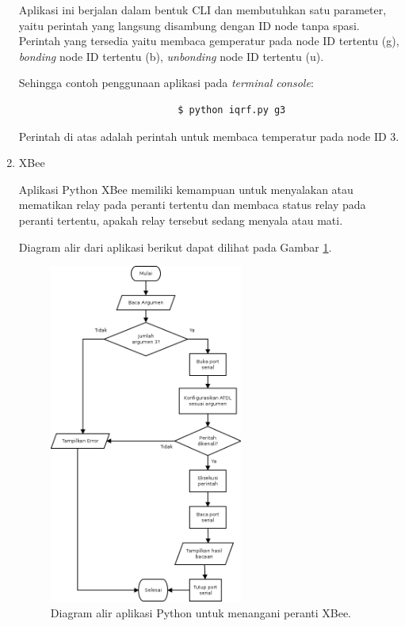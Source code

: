 \begin{enumerate}
					Aplikasi ini berjalan dalam bentuk CLI dan membutuhkan satu parameter, yaitu perintah yang langsung disambung dengan ID node tanpa spasi. Perintah yang tersedia yaitu membaca gemperatur pada node ID tertentu (g), \emph{bonding} node ID tertentu (b), \emph{unbonding} node ID tertentu (u).

					Sehingga contoh penggunaan aplikasi pada \emph{terminal console}:
					\begingroup
					    \fontsize{10pt}{12pt}\selectfont
					    \begin{verbatim}
							$ python iqrf.py g3
					    \end{verbatim}  
					\endgroup
					Perintah di atas adalah perintah untuk membaca temperatur pada node ID 3.

				\item XBee

					Aplikasi Python XBee memiliki kemampuan untuk menyalakan atau mematikan relay pada peranti tertentu dan membaca status relay pada peranti tertentu, apakah relay tersebut sedang menyala atau mati.

					Diagram alir dari aplikasi berikut dapat dilihat pada Gambar \ref{python-xbee}.

					\begin{figure}[H]
					  \centering
					    \includegraphics[width=0.6\textwidth]{gambar/python-xbee}
					    \caption{Diagram alir aplikasi Python untuk menangani peranti XBee.}
					    \label{python-xbee}
					\end{figure}


\end{enumerate}
